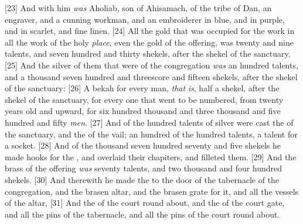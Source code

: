 [23] \textcolor[cmyk]{0.99998,1,0,0}{And with him \emph{was} Aholiab, son of Ahisamach, of the tribe of Dan, an engraver, and a cunning workman, and an embroiderer in blue, and in purple, and in scarlet, and fine linen.}
[24] \textcolor[cmyk]{0.99998,1,0,0}{All the gold that was occupied for the work in all the work of the holy \emph{place}, even the gold of the offering, was twenty and nine talents, and seven hundred and thirty shekels, after the shekel of the sanctuary.}
[25] \textcolor[cmyk]{0.99998,1,0,0}{And the silver of them that were  of the congregation \emph{was} an hundred talents, and a thousand seven hundred and threescore and fifteen shekels, after the shekel of the sanctuary:}
[26] \textcolor[cmyk]{0.99998,1,0,0}{A bekah for every man, \emph{that} \emph{is}, half a shekel, after the shekel of the sanctuary, for every one that went to be numbered, from twenty years old and upward, for six hundred thousand and three thousand and five hundred and fifty \emph{men}.}
[27] \textcolor[cmyk]{0.99998,1,0,0}{And of the hundred talents of silver were cast the  of the sanctuary, and the  of the vail; an hundred  of the hundred talents, a talent for a socket.}
[28] \textcolor[cmyk]{0.99998,1,0,0}{And of the thousand seven hundred seventy and five shekels he made hooks for the , and overlaid their chapiters, and filleted them.}
[29] \textcolor[cmyk]{0.99998,1,0,0}{And the brass of the offering \emph{was} seventy talents, and two thousand and four hundred shekels.}
[30] \textcolor[cmyk]{0.99998,1,0,0}{And therewith he made the  to the door of the tabernacle of the congregation, and the brasen altar, and the brasen grate for it, and all the vessels of the altar,}
[31] \textcolor[cmyk]{0.99998,1,0,0}{And the  of the court round about, and the  of the court gate, and all the pins of the tabernacle, and all the pins of the court round about.}
